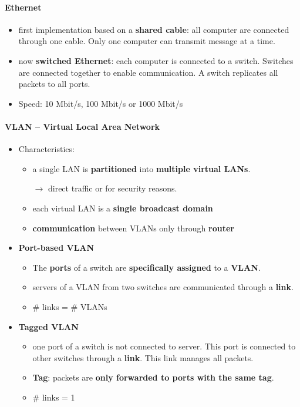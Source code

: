 \paragraph{Ethernet}
\begin{itemize}
	\item first implementation based on a \textbf{shared cable}: all computer are connected through one cable. Only one computer can transmit message at a time.
	\item now \textbf{switched Ethernet}: each computer is connected to a switch. Switches are connected together to enable communication. A switch replicates all packets to all ports.
	\item Speed: 10 Mbit/s, 100 Mbit/s or 1000 Mbit/s
\end{itemize}

\paragraph{VLAN -- Virtual Local Area Network}
\begin{itemize}
	\item Characteristics:
	\begin{itemize}
		\item a single LAN is \textbf{partitioned} into \textbf{multiple virtual LANs}.
		
		$\rightarrow$ direct traffic or for security reasons.
		\item each virtual LAN is a \textbf{single broadcast domain}
		\item \textbf{communication} between VLANs only through \textbf{router} 
	\end{itemize}

	\item \textbf{Port-based VLAN}
	\begin{itemize}
		\item The \textbf{ports} of a switch are \textbf{specifically assigned} to a \textbf{VLAN}.
		\item servers of a VLAN from two switches are communicated through a \textbf{link}.
		\item  \# links = \# VLANs
	\end{itemize}
	
	\item \textbf{Tagged VLAN}
	\begin{itemize}
		\item one port of a switch is not connected to server. This port is connected to other switches through a \textbf{link}. This link manages all packets.
		\item \textbf{Tag}: packets are \textbf{only forwarded to ports with the same tag}.
		\item \# links = 1
	\end{itemize}
\end{itemize}

